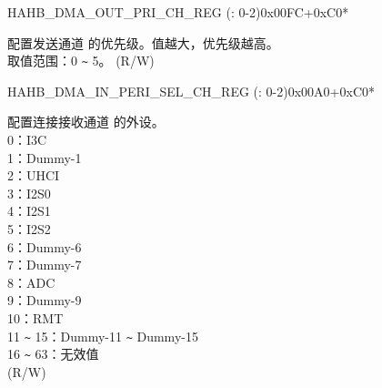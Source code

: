 \begin{register}{H}{AHB\_DMA\_OUT\_PRI\_CH\_REG (: 0-2)}{0x00FC+0xC0*}\label{regdesc:AHBDMAOUTPRICHNREG}
%
%
\regnewline%
\begin{regdesc}\begin{reglist}
\label{fielddesc:AHBDMATXPRICHN}\item [AHB\_DMA\_TX\_PRI\_CH\regindex{n}] 配置发送通道  的优先级。值越大，优先级越高。 \\
取值范围：0 \verb+~+ 5。 (R/W)
\end{reglist}\end{regdesc}
\end{register}


\begin{register}{H}{AHB\_DMA\_IN\_PERI\_SEL\_CH\_REG (: 0-2)}{0x00A0+0xC0*}\label{regdesc:AHBDMAINPERISELCHNREG}
%
%
\regnewline%
\begin{regdesc}\begin{reglist}
\label{fielddesc:AHBDMAPERIINSELCHN}\item [AHB\_DMA\_PERI\_IN\_SEL\_CH\regindex{n}] 配置连接接收通道  的外设。\\
0：I3C\\
1：Dummy-1\\
2：UHCI\\
3：I2S0\\
4：I2S1\\
5：I2S2\\
6：Dummy-6\\
7：Dummy-7\\
8：ADC\\
9：Dummy-9\\
10：RMT\\
11 \verb+~+ 15：Dummy-11 \verb+~+ Dummy-15\\
16 \verb+~+ 63：无效值\\
(R/W)
\end{reglist}\end{regdesc}
\end{register}


